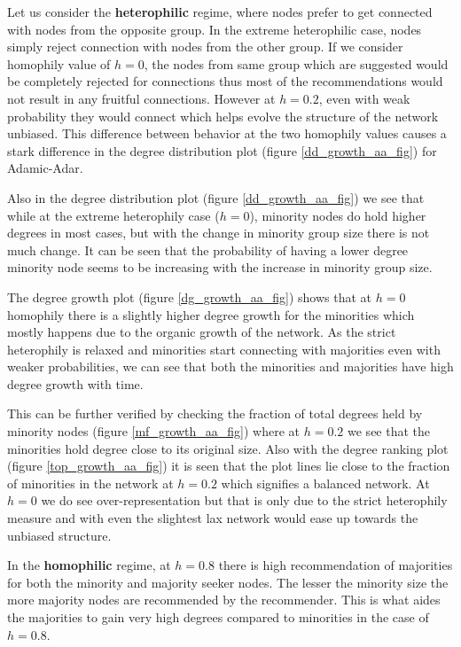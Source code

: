 Let us consider the \textbf{heterophilic} regime, where nodes prefer to get connected with nodes from the opposite group. In the extreme heterophilic case, nodes simply reject connection with nodes from the other group. If we consider homophily value of $h=0$, the nodes from same group which are suggested would be completely rejected for connections thus most of the recommendations would not result in any fruitful connections. However at $h=0.2$, even with weak probability they would connect which helps evolve the structure of the network unbiased. This difference between behavior at the two homophily values causes a stark difference in the degree distribution plot (figure \ref{dd_growth_aa_fig}) for Adamic-Adar. 

Also in the degree distribution plot (figure \ref{dd_growth_aa_fig}) we see that while at the extreme heterophily case ($h=0$), minority nodes do hold higher degrees in most cases, but with the change in minority group size there is not much change. It can be seen that the probability of having a lower degree minority node seems to be increasing with the increase in minority group size.

The degree growth plot (figure \ref{dg_growth_aa_fig}) shows that at $h=0$ homophily there is a slightly higher degree growth for the minorities which mostly happens due to the organic growth of the network. As the strict heterophily is relaxed and minorities start connecting with majorities even with weaker probabilities, we can see that both the minorities and majorities have high degree growth with time.

This can be further verified by checking the fraction of total degrees held by minority nodes (figure \ref{mf_growth_aa_fig}) where at $h=0.2$ we see that the minorities hold degree close to its original size. Also with the degree ranking plot (figure \ref{top_growth_aa_fig}) it is seen that the plot lines lie close to the fraction of minorities in the network at $h=0.2$ which signifies a balanced network. At $h=0$ we do see over-representation but that is only due to the strict heterophily measure and with even the slightest lax network would ease up towards the unbiased structure. 

In the \textbf{homophilic} regime, at $h=0.8$ there is high recommendation of majorities for both the minority and majority seeker nodes. The lesser the minority size the more majority nodes are recommended by the recommender. This is what aides the majorities to gain very high degrees compared to minorities in the case of $h=0.8$.

